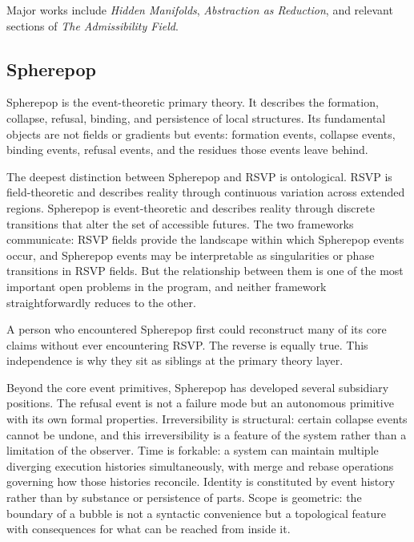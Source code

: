 \documentclass[12pt, twoside]{article}
\begin{document}
Major works include \emph{Hidden Manifolds}, \emph{Abstraction as Reduction},
and relevant sections of \emph{The Admissibility Field}.

\subsection{Spherepop}

Spherepop is the event-theoretic primary theory. It describes the formation,
collapse, refusal, binding, and persistence of local structures. Its
fundamental objects are not fields or gradients but events: formation events,
collapse events, binding events, refusal events, and the residues those events
leave behind.

The deepest distinction between Spherepop and RSVP is ontological. RSVP is
field-theoretic and describes reality through continuous variation across
extended regions. Spherepop is event-theoretic and describes reality through
discrete transitions that alter the set of accessible futures. The two
frameworks communicate: RSVP fields provide the landscape within which
Spherepop events occur, and Spherepop events may be interpretable as
singularities or phase transitions in RSVP fields. But the relationship
between them is one of the most important open problems in the program, and
neither framework straightforwardly reduces to the other.

A person who encountered Spherepop first could reconstruct many of its core
claims without ever encountering RSVP. The reverse is equally true. This
independence is why they sit as siblings at the primary theory layer.

Beyond the core event primitives, Spherepop has developed several
subsidiary positions. The refusal event is not a failure mode but an
autonomous primitive with its own formal properties. Irreversibility is
structural: certain collapse events cannot be undone, and this
irreversibility is a feature of the system rather than a limitation of the
observer. Time is forkable: a system can maintain multiple diverging
execution histories simultaneously, with merge and rebase operations
governing how those histories reconcile. Identity is constituted by event
history rather than by substance or persistence of parts. Scope is
geometric: the boundary of a bubble is not a syntactic convenience but a
topological feature with consequences for what can be reached from inside
it.
\end{document}
